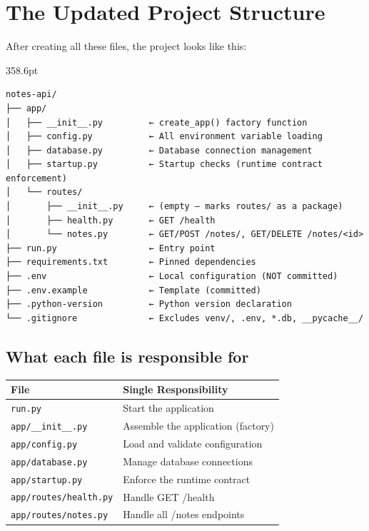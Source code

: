 \setcounter{section}{6}
\section{The Updated Project Structure}\label{15-structuring-the-application:157-the-updated-project-structure}

After creating all these files, the project looks like this:

\begin{diagrambox}[short]{358.6pt}
\begin{Verbatim}[fontsize=\fontsize{9.0}{8.55}\selectfont]
notes-api/
├── app/
│   ├── __init__.py         ← create_app() factory function
│   ├── config.py           ← All environment variable loading
│   ├── database.py         ← Database connection management
│   ├── startup.py          ← Startup checks (runtime contract enforcement)
│   └── routes/
│       ├── __init__.py     ← (empty — marks routes/ as a package)
│       ├── health.py       ← GET /health
│       └── notes.py        ← GET/POST /notes/, GET/DELETE /notes/<id>
├── run.py                  ← Entry point
├── requirements.txt        ← Pinned dependencies
├── .env                    ← Local configuration (NOT committed)
├── .env.example            ← Template (committed)
├── .python-version         ← Python version declaration
└── .gitignore              ← Excludes venv/, .env, *.db, __pycache__/
\end{Verbatim}
\end{diagrambox}


\subsection*{What each file is responsible for}\label{15-structuring-the-application:what-each-file-is-responsible-for}

{\def\LTcaptype{none} %
\begin{longtable}[]{@{}ll@{}}
\toprule\noalign{}
File & Single Responsibility \\
\midrule\noalign{}
\endhead
\bottomrule\noalign{}
\endlastfoot
\texttt{run.py} & Start the application \\
\texttt{app/\_\_init\_\_.py} & Assemble the application (factory) \\
\texttt{app/config.py} & Load and validate configuration \\
\texttt{app/database.py} & Manage database connections \\
\texttt{app/startup.py} & Enforce the runtime contract \\
\texttt{app/}\allowbreak{}\texttt{routes/}\allowbreak{}\texttt{health.py} & Handle GET /health \\
\texttt{app/}\allowbreak{}\texttt{routes/}\allowbreak{}\texttt{notes.py} & Handle all /notes endpoints \\
\end{longtable}
}

